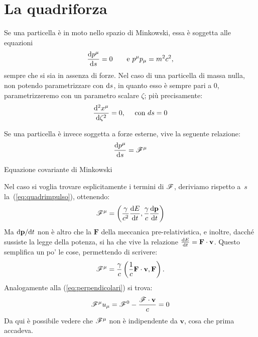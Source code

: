 \section{ La quadriforza}
\begin{osservazione} Se una particella \`e in
moto nello spazio di Minkowski, essa \`e soggetta alle equazioni
\begin{equation}
 \frac{\mathrm{d} p^{\mu}}{\mathrm{d} s}=0\qquad\mbox{e }p^{\mu}p_{\mu}=m^2c^2,
\end{equation}
sempre che si sia in assenza di forze. Nel caso di una particella
di massa nulla, non potendo parametrizzare con $\mathrm{d} s$, in quanto
esso \`e sempre pari a 0, parametrizzeremo con un parametro
scalare $\zeta$; pi\`u precisamente:
\begin{equation}
 \frac{\mathrm{d}^2x^{\mu}}{\mathrm{d} \zeta^2}=0,\quad \mbox{ con } ds=0
\end{equation}
\end{osservazione}
\begin{definizione}[La quadriforza]
 Se una particella \`e invece soggetta a forze
esterne, vive la seguente relazione:
\begin{equation} \frac{\mathrm{d} p^{\mu}}{\mathrm{d} s}=\mathscr{F}^{\mu}
\label{eq:covariantem}
\end{equation}
\begin{center}
\scriptsize Equazione covariante di Minkowski
\end{center}
Nel caso si voglia trovare esplicitamente i termini di $\mathscr{F}$,
deriviamo rispetto a~$s$ la~(\ref{eq:quadrimpulso}), ottenendo:
\begin{equation}
 \mathscr{F}^{\mu}=\left(\frac{\gamma}{c^2}\frac{\mathrm{d} E}{\mathrm{d}
t},\frac{\gamma}{c}\frac{\mathrm{d} \mathbf{p}}{\mathrm{d} t}\right)
\end{equation}
Ma $\mathrm{d} \mathbf{p}/ \mathrm{d} t$ non \`e altro che la $\mathbf{F}$ della
meccanica pre-relativistica, e inoltre, dacch\'e sussiste la legge
della potenza, si ha che vive la relazione $\frac{\mathrm{d} E}{\mathrm{d}
t}=\mathbf{F}\cdot\mathbf{v}$. Questo semplif\mbox{}ica un po' le
cose, permettendo di scrivere:
\begin{equation}
\mathscr{F}^{\mu}=\frac{\gamma}{c}
\left(\frac{1}{c}\mathbf{F}\cdot\mathbf{v}, \mathbf{F}\right).
\end{equation}
Analogamente alla (\ref{eq:perpendicolari}) si trova:
\begin{equation}
 \mathscr{F}^{\mu}u_{\mu} = \mathscr{F}^0 - 
  \frac{\mathbf{\mathscr{F}}\cdot\mathbf{v}}{c}=0
\end{equation}
Da qui \`e possibile vedere che $\mathscr{F}^{\mu}$ non \`e
indipendente da $\mathbf{v}$, cosa che prima accadeva.
\end{definizione}
